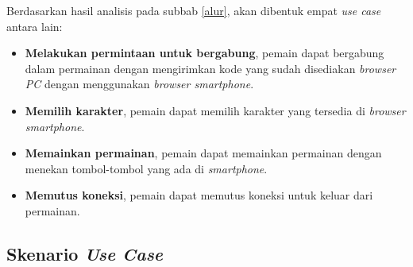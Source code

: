 Berdasarkan hasil analisis pada subbab \ref{alur}, akan dibentuk empat \textit{use case} antara lain:

\begin{itemize}
	\item \textbf{Melakukan permintaan untuk bergabung}, pemain dapat bergabung dalam permainan dengan mengirimkan kode yang sudah disediakan \textit{browser PC} dengan menggunakan \textit{browser smartphone}.
	
	\item \textbf{Memilih karakter}, pemain dapat memilih karakter yang tersedia di \textit{browser smartphone}.
	
	\item \textbf{Memainkan permainan}, pemain dapat memainkan permainan dengan menekan tombol-tombol yang ada di \textit{smartphone}.
	
	\item \textbf{Memutus koneksi}, pemain dapat memutus koneksi untuk keluar dari permainan.
\end{itemize}

\subsection{Skenario \textit{Use Case}}

